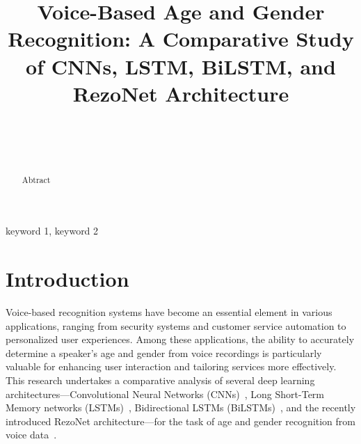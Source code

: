 \documentclass[conference, 10pt]{IEEEtran}
\begin{document}
\title{\textbf{Voice-Based Age and Gender Recognition: A Comparative Study of CNNs, LSTM, BiLSTM, and RezoNet Architecture}\\
}
\author{
\\
\and
{}
\\
}



\maketitle

\begin{abstract}
Abtract
\end{abstract}

\begin{IEEEkeywords}
keyword 1, keyword 2
\end{IEEEkeywords}

\section{Introduction}          %
Voice-based recognition systems have become an essential element in various applications, ranging from security systems and customer service automation to personalized user experiences. Among these applications, the ability to accurately determine a speaker's age and gender from voice recordings is particularly valuable for enhancing user interaction and tailoring services more effectively. This research undertakes a comparative analysis of several deep learning architectures—Convolutional Neural Networks (CNNs)~\cite{chua1998cnn}, Long Short-Term Memory networks (LSTMs)~\cite{smagulova2019survey}, Bidirectional LSTMs (BiLSTMs)~\cite{siami2019performance}, and the recently introduced RezoNet architecture—for the task of age and gender recognition from voice data~\cite{hanifa2021review}.
\end{document}
